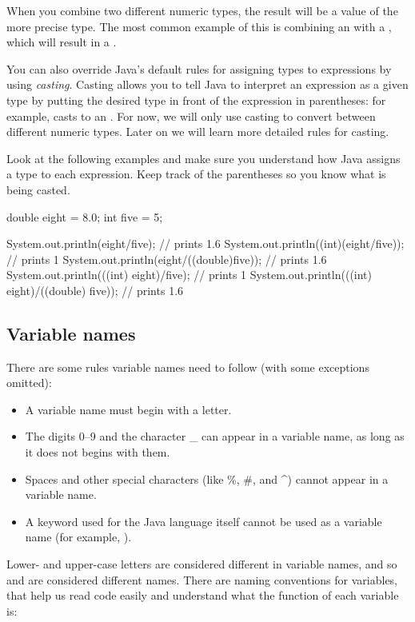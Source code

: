 When you combine two different numeric types, the result will be a value of the more precise type. The most common example of this is combining an  with a , which will result in a .

You can also override Java's default rules for assigning types to expressions by using \emph{casting}. Casting allows you to tell Java to interpret an expression as a given type by putting the desired type in front of the expression in parentheses: for example,  casts  to an . For now, we will only use casting to convert between different numeric types. Later on we will learn more detailed rules for casting.

\begin{example}
  Look at the following examples and make sure you understand how Java assigns a type to each expression. Keep track of the parentheses so you know what is being casted.
  \begin{code}
    double eight = 8.0;
    int five = 5;

    System.out.println(eight/five); // prints 1.6
    System.out.println((int)(eight/five)); // prints 1
    System.out.println(eight/((double)five)); // prints 1.6
    System.out.println(((int) eight)/five); // prints 1
    System.out.println(((int) eight)/((double) five)); // prints 1.6
  \end{code}
\end{example}

\subsection{Variable names}

There are some rules variable names need to follow (with some exceptions omitted):

\begin{itemize}
\item A variable name must begin with a letter.
\item The digits 0--9 and the character \_ can appear in a variable name, as long as it does not begins with them. 
\item Spaces and other special characters (like \%, \#, and \textasciicircum) cannot appear in a variable name.
\item A keyword used for the Java language itself cannot be used as a variable name (for example, ).
\end{itemize}

Lower- and upper-case letters are considered different in variable names, and so  and  are considered different names. There are naming conventions for variables, that help us read code easily and understand what the function of each variable is:

